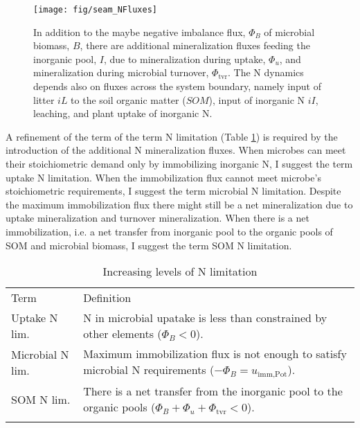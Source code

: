 \begin{figure}[t] \vspace*{2mm}
\begin{center}
\texttt{[image: fig/seam\_NFluxes]} 
\end{center}
\caption{
In addition to the maybe negative imbalance flux, $\Phi_B$ of microbial
biomass, $B$, there are additional mineralization fluxes feeding the inorganic
pool, $I$, due to mineralization during uptake, $\Phi_u$, and mineralization
during microbial turnover, $\Phi_{\operatorname{tvr}}$. The N dynamics depends
also on fluxes across the system boundary, namely input of litter $iL$ to the
soil organic matter ($SOM$), input of inorganic N $iI$, leaching, and plant
uptake of inorganic N.
\label{fig:SEAMStructNFluxes}}
\end{figure}

A refinement of the term of the term N limitation (Table
\ref{tab:NutrientLimDefs}) is required by the introduction of the additional N
mineralization fluxes.
When microbes can meet their stoichiometric demand only by immobilizing
inorganic N, I suggest the term uptake N limitation.
When the immobilization flux cannot meet microbe's stoichiometric requirements,
I suggest the term microbial N limitation. Despite the maximum immobilization flux
there might still be a net mineralization due to uptake mineralization and turnover
mineralization.
When there is a net immobilization, i.e. a net transfer from inorganic pool to
the organic pools of SOM and microbial biomass, I suggest the term SOM N
limitation.

\begin{table}[t]
\caption{Increasing levels of N limitation \label{tab:NutrientLimDefs}}
\centering
\begin{tabular}{lp{5.5cm}}
\tophline
Term &  Definition \\
\middlehline
Uptake N lim. & N in microbial upatake is less than 
constrained by other elements (${\Phi_B < 0}$).
\\
Microbial N lim. & Maximum immobilization flux is not enough to satisfy
microbial N requirements (${-\Phi_B =
u_{\operatorname{imm,Pot}}}$).
\\
SOM N lim. & There is a net transfer from the inorganic pool to
the organic pools (${\Phi_B+\Phi_u+\Phi_{\operatorname{tvr}}<0}$).
\\
\bottomhline
\end{tabular}
\end{table}
 


